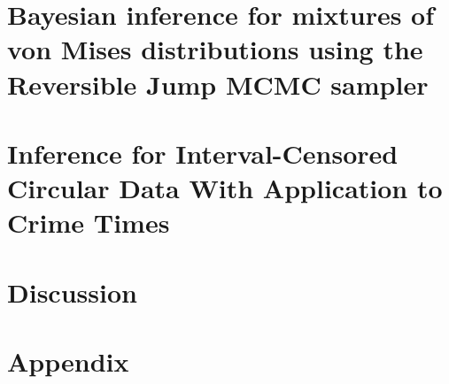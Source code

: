 \documentclass[12pt, a4paper]{book}\usepackage[]{graphicx}\usepackage[]{color}
\begin{document}
\chapter{Bayesian inference for mixtures of von Mises distributions using the Reversible Jump MCMC sampler}
\label{revrjump}

%
\chapter{Inference for Interval-Censored Circular Data With Application to Crime Times}
\label{dpm_crim}



% 


\chapter{Discussion}




\chapter{Appendix}

\appendix






\backmatter



\end{document}

